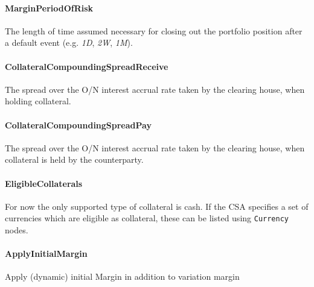 \paragraph*{MarginPeriodOfRisk} The length of time assumed necessary
for closing out the portfolio position after a default event  (e.g. \emph{1D},
  \emph{2W}, \emph{1M}).

\paragraph*{CollateralCompoundingSpreadReceive} The spread over the O/N
interest accrual rate taken by the clearing house, when holding
collateral.

\paragraph*{CollateralCompoundingSpreadPay} The spread over the O/N
interest accrual rate taken by the clearing house, when collateral is
held by the counterparty.

\paragraph*{EligibleCollaterals} For now the only supported type of
collateral is cash. If the CSA specifies a set of currencies which
are eligible as collateral, these can be listed using
\lstinline!Currency! nodes.

\paragraph*{ApplyInitialMargin} Apply (dynamic) initial Margin in
addition to variation margin


